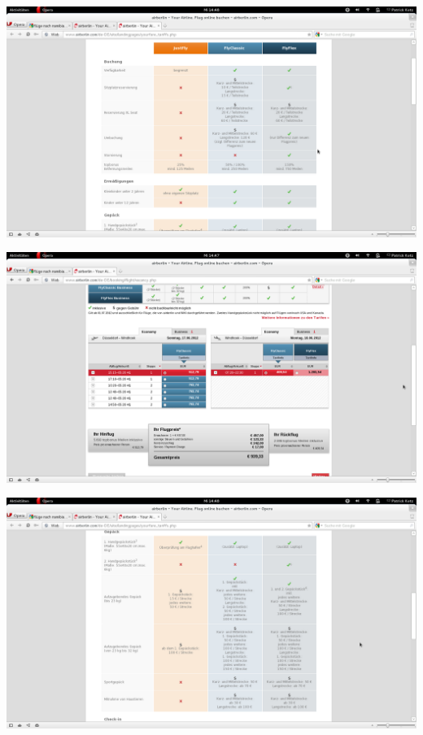 \documentclass[11pt]{article}
\begin{document}






\includegraphics[scale=auto]{Flug_Air_Berlin/Bildschirmfoto_am_2012-06-13_14_47_20.png} 

\includegraphics[scale=0.9]{Flug_Air_Berlin/Bildschirmfoto_am_2012-06-13_14_47_22.png} 

\includegraphics[scale=0.9]{Flug_Air_Berlin/Bildschirmfoto_am_2012-06-13_14_47_26.png} 
\end{document}
